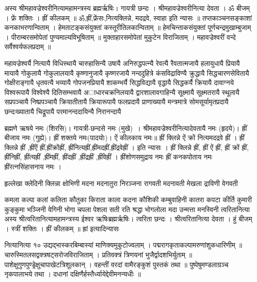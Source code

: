 अस्य श्रीमहावज्रेश्वरीनित्यामहामन्त्रस्य ब्रह्मर्ऋषिः। गायत्री छन्दः । श्रीमहावज्रेश्वरीनित्या देवता । ॐ बीजम् । फ्रें शक्तिः । ह्रीं कीलकम् ॥
ॐ,ह्रीं,फ्रेंसः,नित्यक्लिन्ने, मदद्रवे, स्वाहा इति   न्यासः ॥
तप्तकाञ्चनसङ्काशां कनकाभरणान्विताम् । हेमताटङ्कसंयुक्तां कस्तूरीतिलकान्विताम् ॥
हेमचिन्ताकसंयुक्तां पूर्णचन्द्रमुखाम्बुजाम् । पीराम्बरसमोपेतां पुण्यमाल्यविभूषिताम् ॥
मुक्ताहारसमोपेतां मुकुटेन विराजिताम् । महावज्रेश्वरीं वन्दे सर्वैश्वर्यफलप्रदाम् ॥

महावज्रेश्वर्यै नित्यायै विधिस्थायै चारुहासिन्यै उषायै अनिरुद्धपत्न्यै रेवत्यै रैवतात्मजायै हलायुधायै प्रियायै मायायै गोकुलायै गोकुलालयायै कृष्णानुजायै कृष्णरजायै नन्ददुहित्रे कंसविद्राविण्यै क्रुद्धायै सिद्धचारणसेवितायै गोक्षीराङ्गायै धृतवत्यै भव्यायै गोपजनप्रियायै शाकम्भर्यै सिद्धविद्यायै वृद्धायै सिद्धकर्यै क्रियायै दावाग्नये विश्वरूपायै विश्वेश्यै दितिसम्भवायै अाधारचक्रनिलयायै द्वारशालावगाहिन्यै सूक्ष्मायै सूक्ष्मतरायै स्थूलायै सप्रपञ्चायै निष्प्रपञ्चायै क्रियातीतायै क्रियारूपायै फलप्रदायै प्राणाख्यायै मन्त्रमात्रे सोमसूर्यामृतप्रदायै छन्दःख्यातायै चिद्रूपायै परमानन्ददायिन्यै
निरानन्दायै

ब्रह्मणे ऋषये नमः (शिरसि)। गायत्री-छन्दसे नमः (मुखे)~। श्रीमहावज्रेश्वरीनित्यादेवतायै नमः (हृदये)। ह्रीं बीजाय नमः (गुह्ये)।  ह्रीं शक्तये नमः(पादयोः)।
ऐं कीलकाय नमः॥
ह्रीं क्लिन्ने ऐं क्रों नित्यमदद्रवे ह्रीं ।
ह्रीं क्लिन्ने ह्रीं ,ह्रींऐं ह्रीं,ह्रींक्रोंह्रीं, ह्रींनित्यह्रीं,ह्रींमदह्रीं,ह्रींद्रवेह्रीं  । इति न्यासः ।
ह्रीं क्लिन्ने ह्रीं, ह्रीं ऐं ह्रीं, ह्रीं क्रों ह्रीं, ह्रींनिह्रीं, ह्रींत्यह्रीं ,ह्रींमह्रीं, ह्रींदह्रीं ,ह्रींद्रह्रीं ,ह्रींवेह्रीं । 
ह्रींशोणसमुद्राय नमः ह्रीं कनकपोताय नमः ह्रींरत्नसिंहासनाय नमः ।

हृल्लेखा क्लेदिनी क्लिन्ना क्षोभिणी मदना मदनातुरा निरञ्जना रागवती मदनावती मेखला द्राविणी वेगवती 

कमला कल्पा कलां कलिता कौतुका किराता काला कदना कौशिकी कम्बुवाहिनी कातरा कपटा कीर्ति कुमारी कुङ्कुमा भञ्जिनी वेगिनी भोगा चपला पेशला सती रति श्रद्धा भोगलोला मदा उन्मत्ता मनस्विनी 
त्वरितानित्या
अस्य श्रीत्वरितानित्यामहामन्त्रस्य ईश्वर ऋषिःब्रह्मर्ऋषिः। त्वरिता छन्दः । श्रीत्वरितानित्या देवता । हुं बीजम् । स्त्रीं शक्तिः । ह्रीं कीलकम् ॥
ह्रां इत्यादिन्यासः



नित्यानित्या १०
उद्यद्भास्करबिम्बास्यां माणिक्यमुकुटोज्वलाम् । पद्मरागकृताकल्पामरुणांशुकधारिणीम् ॥
चारुस्मितलसद्वक्त्रषट्सरोजविराजिताम् । प्रतिवक्त्रं त्रिणयनां भुजैर्द्वादशभिर्युताम् ॥
पाशेक्षुगुणपुण्ड्रेक्षुचापाखेटत्रिशूलकान् । वहन्तीं वरदां वामैरङ्कुशं पुस्तकं तथा ॥
पुष्पेषुमण्डलाग्रञ्च नृकपालाभये तथा । दधानां दक्षिणैर्हस्तैर्ध्यायेद्देवीमनन्यधीः ॥


